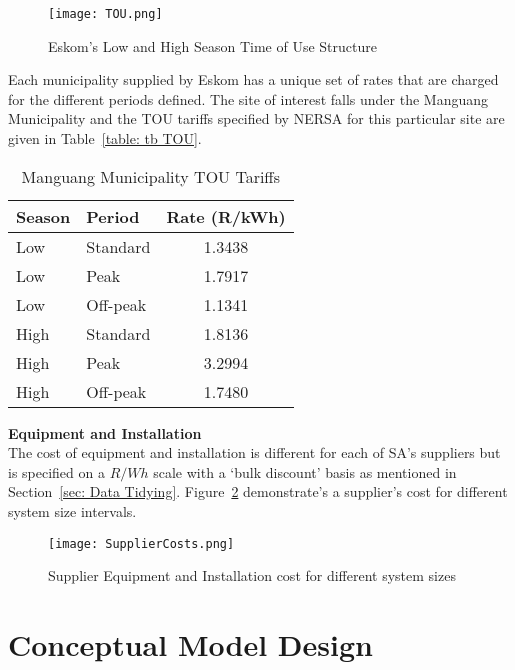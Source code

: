 \documentclass[a4paper,11pt,fleqn]{report}
\begin{document}
\begin{figure}[h]
\begin{center}
\texttt{[image: TOU.png]}
\caption{Eskom's Low and High Season Time of Use Structure}
\label{fig: TOU_typical}
\end{center}
\end{figure}

Each municipality supplied by Eskom has a unique set of rates that are charged for the different periods defined. The site of interest falls under the Manguang Municipality and the \ac{TOU} tariffs specified by NERSA for this particular site are given in Table~\ref{table:	tb TOU}.\\

\begin{table}[h]
\caption {Manguang Municipality TOU Tariffs} \label{table:	tb TOU} 
\begin{center}
\begin{tabular}{p{3cm} p{3cm} c{3cm}}\toprule
	{\textbf{Season}} & {\textbf{Period}} & {\textbf{Rate (R/kWh)}}\\ \midrule
    Low & Standard & 1.3438\\
    Low & Peak & 1.7917\\
    Low & Off-peak & 1.1341\\
    High & Standard & 1.8136\\
    High & Peak & 3.2994\\
    High & Off-peak & 1.7480\\ \bottomrule
\end{tabular}
\end{center}
\end{table}

\noindent\textbf{Equipment and Installation}\\
The cost of equipment and installation is different for each of \ac{SA}'s suppliers but is specified on a $R/Wh$ scale with a `bulk discount' basis as mentioned in Section~\ref{sec: Data Tidying}. Figure~\ref{fig: SupplierCosts} demonstrate's a supplier's cost for different system size intervals.

\begin{figure}[h]
\begin{center}
\texttt{[image: SupplierCosts.png]}
\caption{Supplier Equipment and Installation cost for different system sizes}
\label{fig: SupplierCosts}
\end{center}
\end{figure}

\chapter{Conceptual Model Design} \label{chp: 4 Conceptual Model Design}
\end{document}
